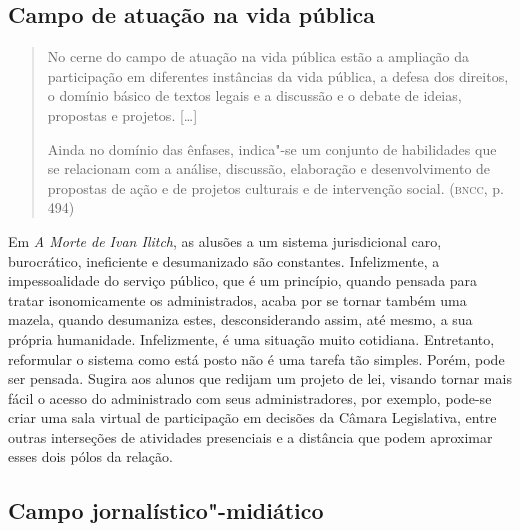 \documentclass[12pt]{extarticle}
\begin{document}
\subsection{Campo de atuação na vida pública}

\begin{quote}
No cerne do campo de atuação na vida pública estão a ampliação da
participação em diferentes instâncias da vida pública, a defesa dos
direitos, o domínio básico de textos legais e a discussão e o debate de
ideias, propostas e projetos. {[}\ldots{}{]}

Ainda no domínio das ênfases, indica"-se um conjunto de habilidades que
se relacionam com a análise, discussão, elaboração e desenvolvimento de
propostas de ação e de projetos culturais e de intervenção social.
(\textsc{bncc}, p. 494)
\end{quote}

Em \emph{A Morte de Ivan Ilitch}, as alusões a um sistema
jurisdicional caro, burocrático, ineficiente e desumanizado são
constantes. Infelizmente, a impessoalidade do serviço público, que é
um princípio, quando pensada para tratar isonomicamente os
administrados, acaba por se tornar também uma mazela, quando
desumaniza estes, desconsiderando assim, até mesmo, a sua própria
humanidade. Infelizmente, é uma situação muito cotidiana. Entretanto,
reformular o sistema como está posto não é uma tarefa tão simples.
Porém, pode ser pensada. Sugira aos alunos que redijam um projeto de
lei, visando tornar mais fácil o acesso do administrado com seus
administradores, por exemplo, pode-se criar uma sala virtual de
participação em decisões da Câmara Legislativa, entre outras
interseções de atividades presenciais e a distância que podem
aproximar esses dois pólos da relação.

\subsection{Campo jornalístico"-midiático}
\end{document}
